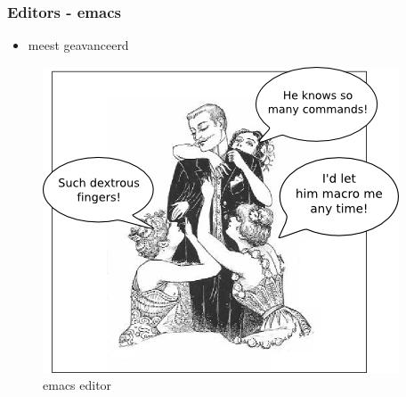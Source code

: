 \documentclass{beamer}
\begin{document}
\begin{frame}
  \frametitle{Editors - emacs}
  \begin{itemize}
  \item<1-> meest geavanceerd
  \end{itemize}
  \begin{figure}[H]
    \begin{center}
      \includegraphics[scale=0.4]{images/emacsmanwomen}
    \end{center}
    \caption{emacs editor}
    \label{fig:editor_emacs}
  \end{figure}
\end{frame}
\end{document}
